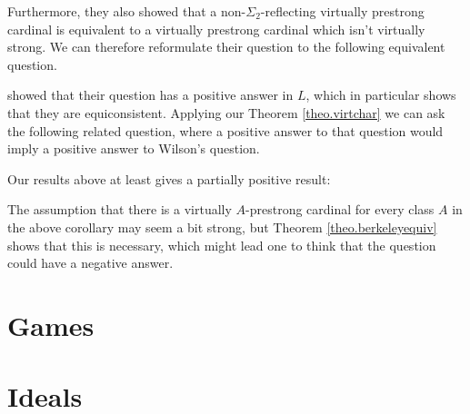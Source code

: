 \documentclass[../../main]{subfiles}
\begin{document}
\qquad Furthermore, they also showed that a non-$\Sigma_2$-reflecting virtually prestrong cardinal is equivalent to a virtually prestrong cardinal which isn't virtually strong. We can therefore reformulate their question to the following equivalent question.


\cite{RemarkableWilson} showed that their question has a positive answer in $L$, which in particular shows that they are equiconsistent. Applying our Theorem \ref{theo.virtchar} we can ask the following related question, where a positive answer to that question would imply a positive answer to Wilson's question.


Our results above at least gives a partially positive result:


The assumption that there is a virtually $A$-prestrong cardinal for every class $A$ in the above corollary may seem a bit strong, but Theorem \ref{theo.berkeleyequiv} shows that this is necessary, which might lead one to think that the question could have a negative answer. 



\section{Games}



\section{Ideals}

\end{document}

